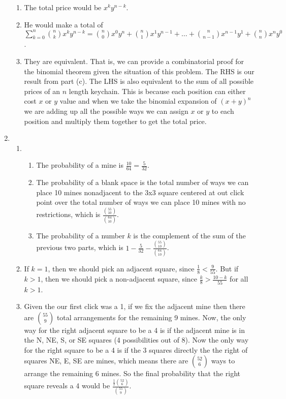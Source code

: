 \begin{enumerate}
\begin{enumerate}
        \item The total price would be $x^k y^{n-k}$.
        
        \item He would make a total of $\sum\limits_{k=0}^{n}\binom{n}{k}x^ky^{n-k} = \binom{n}{0}x^0y^{n} + \binom{n}{1}x^1y^{n-1} + \ldots + \binom{n}{n-1}x^{n-1}y^1 + \binom{n}{n}x^ny^0$.
        
        \item They are equivalent. That is, we can provide a combinatorial proof for the binomial theorem given the situation of this problem. The RHS is our result from part (c). The LHS is also equivalent to the sum of all possible prices of an $n$ length keychain. This is because each position can either cost $x$ or $y$ value and when we take the binomial expansion of $(x+y)^n$ we are adding up all the possible ways we can assign $x$ or $y$ to each position and multiply them together to get the total price.
    \end{enumerate}
    
    \item \begin{enumerate}
        \item \begin{enumerate} 
            \item The probability of a mine is $\frac{10}{64} = \frac{5}{32}$.
            \item The probability of a blank space is the total number of ways we can place 10 mines nonadjacent to the 3x3 square centered at out click point over the total number of ways we can place 10 mines with no restrictions, which is $\frac{\binom{55}{10}}{\binom{64}{10}}$.
            \item The probability of a number $k$ is the complement of the sum of the previous two parts, which is $1 - \frac{5}{32} - \frac{\binom{55}{10}}{\binom{64}{10}}$.
        \end{enumerate}
        
        \item If $k = 1$, then we should pick an adjacent square, since $\frac{1}{8} < \frac{9}{55}$. But if $k > 1$, then we should pick a non-adjacent square, since $\frac{k}{8} > \frac{10 - k}{55}$ for all $k > 1$.
        
        \item Given the our first click was a 1, if we fix the adjacent mine then there are $\binom{55}{9}$ total arrangements for the remaining 9 mines. Now, the only way for the right adjacent square to be a 4 is if the adjacent mine is in the N, NE, S, or SE squares (4 possibilities out of 8). Now the only way for the right square to be a 4 is if the 3 squares directly the the right of squares NE, E, SE are mines, which means there are $\binom{52}{6}$ ways to arrange the remaining 6 mines. So the final probability that the right square reveals a 4 would be $\frac{\frac{1}{2}\binom{52}{6}}{\binom{55}{9}}$.
    \end{enumerate}
    

\end{enumerate}
